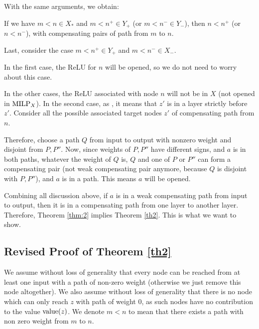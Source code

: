 	
	With the same arguments, we obtain:
	
	\begin{lemma}
	If we have $m<n \in X_*$ and $m < n^+ \in Y_+$ (or $m < n^- \in Y_-$),
	then $n < n^+$ (or $n < n^-$), with compensating pairs of path from $m$ to $n$.
	\end{lemma}
	
	Last, consider the case $m<n^+ \in Y_+$ and $m < n^- \in X_-$.
	



In the first case, the ReLU for $n$ will be opened, so we do not need to worry about this case.
			
			In the other cases, the ReLU associated with node $n$ will not be in $X$ 
			(not opened in ${\textrm{MILP}}_X$).
			In the second case, as 
			, it means that $z'$ is in a layer strictly before $z'$.
			Consider all the possible associated target nodes $z'$ of compensating path from $n$.

			
			Therefore, choose a path $Q$ from input to output with nonzero weight and disjoint from $P,P''$. Now, since weights of $P,P''$ have different signs, and $a$ is in both paths, whatever the weight of $Q$ is, $Q$ and one of  $P$ or $P''$ can form a compensating pair (not weak compensating pair anymore, because $Q$ is disjoint with $P,P''$), and $a$ is in a path. This means $a$ will be opened.
			
			Combining all discussion above, if $a$ is in a weak compensating path from input to output, then it is in a compensating path from one layer to another layer. Therefore, Theorem \ref{thm:2} implies Theorem \ref{th2}. This is what we want to show.
			\fi
			

 			
		
			

\newpage

	
\subsection{Revised Proof of Theorem \ref{th2}}
			
We assume without loss of generality that every node can be reached from at least one input with a path of non-zero weight (otherwise we just remove this node altogether).
We also assume without loss of generality that there is no node which can only reach $z$ with path of weight $0$, as such nodes have no contribution to the value ${\textrm{value}}(z)$. We denote $m<n$ to mean that there exists a path with non zero weight from $m$ to $n$.

